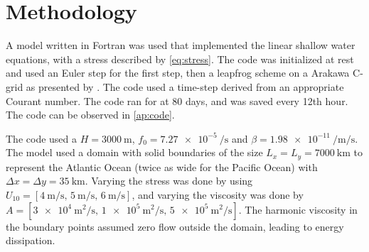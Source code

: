 \section{Methodology}
A model written in Fortran was used that implemented the linear shallow water equations, with a stress described by \autoref{eq:stress}. The code was initialized at rest and used an Euler step for the first step, then a leapfrog scheme on a Arakawa C-grid as presented by \citet{Doos2022}. The code used a time-step derived from an appropriate Courant number. The code ran for at 80 days, and was saved every 12th hour. The code can be observed in \autoref{ap:code}.

The code used a $H=\SI{3000}{\meter}$, $f_0=\SI{7.27e-5}{\per\second}$ and $\beta=\SI{1.98e-11}{\per\meter\per\second}$. The model used a domain with solid boundaries of the size $L_x=L_y = \SI{7000}{\kilo\meter}$ to represent the Atlantic Ocean (twice as wide for the Pacific Ocean) with $\Delta x=\Delta y = \SI{35}{\kilo\meter}$. Varying the stress was done by using $U_{10} = [\SI{4}{\meter\per\second},\, \SI{5}{\meter\per\second},\, \SI{6}{\meter\per\second}]$, and varying the viscosity was done by $A = [\SI{3e4}{\meter\squared\per\second},\, \SI{1e5}{\meter\squared\per\second},\, \SI{5e5}{\meter\squared\per\second}]$. The harmonic viscosity in the boundary points assumed zero flow outside the domain, leading to energy dissipation. 